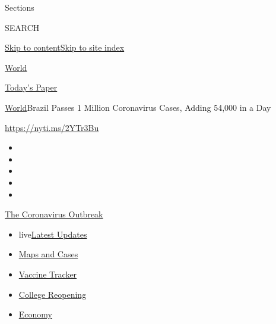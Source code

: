 Sections

SEARCH

\protect\hyperlink{site-content}{Skip to
content}\protect\hyperlink{site-index}{Skip to site index}

\href{https://www.nytimes.com/section/world}{World}

\href{https://myaccount.nytimes.com/auth/login?response_type=cookie\&client_id=vi}{}

\href{https://www.nytimes.com/section/todayspaper}{Today's Paper}

\href{/section/world}{World}\textbar{}Brazil Passes 1 Million
Coronavirus Cases, Adding 54,000 in a Day

\url{https://nyti.ms/2YTr3Bu}

\begin{itemize}
\item
\item
\item
\item
\item
\end{itemize}

\href{https://www.nytimes.com/news-event/coronavirus?action=click\&pgtype=Article\&state=default\&region=TOP_BANNER\&context=storylines_menu}{The
Coronavirus Outbreak}

\begin{itemize}
\tightlist
\item
  live\href{https://www.nytimes.com/2020/08/04/world/coronavirus-cases.html?action=click\&pgtype=Article\&state=default\&region=TOP_BANNER\&context=storylines_menu}{Latest
  Updates}
\item
  \href{https://www.nytimes.com/interactive/2020/us/coronavirus-us-cases.html?action=click\&pgtype=Article\&state=default\&region=TOP_BANNER\&context=storylines_menu}{Maps
  and Cases}
\item
  \href{https://www.nytimes.com/interactive/2020/science/coronavirus-vaccine-tracker.html?action=click\&pgtype=Article\&state=default\&region=TOP_BANNER\&context=storylines_menu}{Vaccine
  Tracker}
\item
  \href{https://www.nytimes.com/2020/08/02/us/covid-college-reopening.html?action=click\&pgtype=Article\&state=default\&region=TOP_BANNER\&context=storylines_menu}{College
  Reopening}
\item
  \href{https://www.nytimes.com/live/2020/08/04/business/stock-market-today-coronavirus?action=click\&pgtype=Article\&state=default\&region=TOP_BANNER\&context=storylines_menu}{Economy}
\end{itemize}

